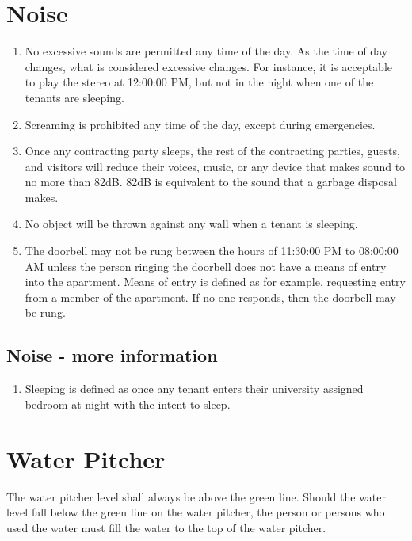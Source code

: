 \documentclass[10pt]{article}
\begin{document}
\section{Noise} \label{Noise}
\begin{enumerate}
	\item No excessive sounds are permitted any time of the day. As the time of day changes, what is considered excessive changes. For instance, it is acceptable to play the stereo at 12:00:00 PM, but not in the night when one of the tenants are sleeping.
	\item Screaming is prohibited any time of the day, except during emergencies.
	\item Once any contracting party sleeps, the rest of the contracting parties, guests, and visitors will reduce their voices, music, or any device that makes sound to no more than 82dB. 82dB is equivalent to the sound that a garbage disposal makes.
	\item No object will be thrown against any wall when a tenant is sleeping.
	\item The doorbell may not be rung between the hours of 11:30:00 PM to 08:00:00 AM unless the person ringing the doorbell does not have a means of entry into the apartment.
	\subitem Means of entry is defined as for example, requesting entry from a member of the apartment. If no one responds, then the doorbell may be rung.
	
\end{enumerate}
\subsection{Noise - more information}
\begin{enumerate}
	\item Sleeping is defined as once any tenant enters their university assigned bedroom at night with the intent to sleep.
\end{enumerate}
\section{Water Pitcher} \label{Water Pitcher}
	The water pitcher level shall always be above the green line. Should the water level fall below the green line on the water pitcher, the person or persons who used the water must fill the water to the top of the water pitcher.


\end{document}
